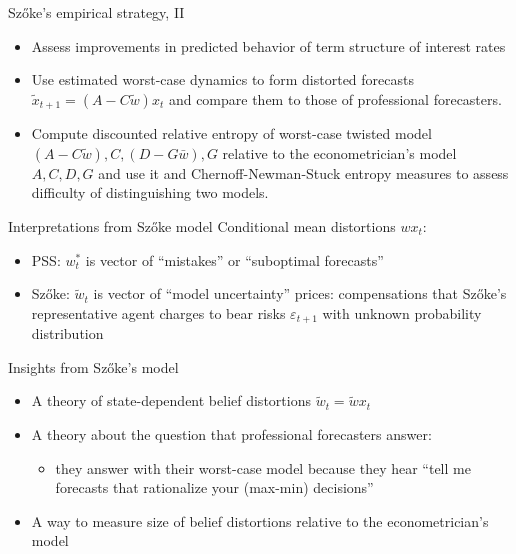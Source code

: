 \documentclass{beamer}
\theoremstyle{Definition}
\begin{document}
\begin{frame}{Sz\H{o}ke's empirical strategy, II}
\begin{itemize}
\item Assess improvements in predicted behavior of term structure of interest rates
\item Use estimated worst-case dynamics to form distorted forecasts $\tilde  x_{t+1} = (A - C \tilde w) x_t$ and compare them
to those of professional forecasters.
\item Compute discounted relative entropy of worst-case twisted model $(A - C \tilde  w), C, (D - G \bar w), G$ relative to the econometrician's model
$A, C, D, G$ and use it and Chernoff-Newman-Stuck entropy measures to assess difficulty of distinguishing  two models.
\end{itemize}

\end{frame}



\begin{frame}{Interpretations from Sz\H{o}ke  model}
Conditional mean distortions $w x_t$:
\begin{itemize}
\item PSS: $ w^*_t$ is vector of ``mistakes'' or ``suboptimal forecasts''
\item Sz\H{o}ke: $\tilde  w_t$ is vector of ``model uncertainty'' prices:  compensations that Sz\H{o}ke's representative
agent charges to bear risks   $\varepsilon_{t+1}$  with unknown probability distribution
\end{itemize}

\end{frame}


\begin{frame}{Insights from Sz\H{o}ke's  model}
\begin{itemize}
\item A theory of state-dependent belief distortions $\tilde w_t = \tilde w x_t$
\item A theory about the question that professional forecasters answer:
\begin{itemize}
\item they  answer with their
worst-case model because they hear  ``tell me forecasts that rationalize your (max-min) decisions''
\end{itemize}
\item A way to measure size of  belief distortions  relative to the  econometrician's model
\end{itemize}

\end{frame}
\end{document}
